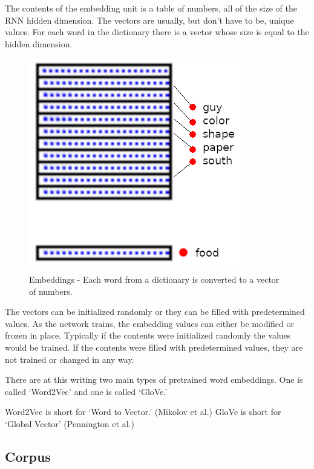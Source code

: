 The contents of the embedding unit is a table of numbers, all of the size of the RNN hidden dimension. The vectors are usually, but don\textquoteright t have to be, unique values. For each word in the dictionary there is a vector whose size is equal to the hidden dimension.

\begin{figure}[H]
	\begin{center}
		\includegraphics[scale=0.5]{diagram-embedding}
		
		
	\end{center}
	\caption[Word Embeddings]{Embeddings - Each word from a dictionary is converted to a vector of numbers.}
	

\end{figure}

The vectors can be initialized randomly or they can be filled with predetermined values. As the network trains, the embedding values can either be modified or frozen in place. Typically if the contents were initialized randomly the values would be trained. If the contents were filled with predetermined values, they are not trained or changed in any way. 

There are at this writing two main types of pretrained word embeddings. One is called \textquoteleft Word2Vec\textquoteright{} and one is called \textquoteleft GloVe.\textquoteright  

Word2Vec is short for \textquoteleft Word to Vector.\textquoteright{} (Mikolov et al.) \cite{mikolov2013efficient} GloVe is short for \textquoteleft Global Vector\textquoteright{} (Pennington et al.) \cite{pennington-etal-2014-glove} 


\subsection{Corpus}

